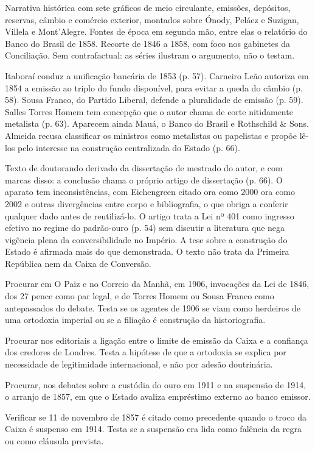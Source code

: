 
Narrativa histórica com sete gráficos de meio circulante, emissões, depósitos, reservas, câmbio e comércio exterior, montados sobre Ónody, Peláez e Suzigan, Villela e Mont'Alegre. Fontes de época em segunda mão, entre elas o relatório do Banco do Brasil de 1858. Recorte de 1846 a 1858, com foco nos gabinetes da Conciliação. Sem contrafactual: as séries ilustram o argumento, não o testam.

Itaboraí conduz a unificação bancária de 1853 (p. 57). Carneiro Leão autoriza em 1854 a emissão ao triplo do fundo disponível, para evitar a queda do câmbio (p. 58). Sousa Franco, do Partido Liberal, defende a pluralidade de emissão (p. 59). Salles Torres Homem tem concepção que o autor chama de corte nitidamente metalista (p. 63). Aparecem ainda Mauá, o Banco do Brasil e Rothschild \& Sons. Almeida recusa classificar os ministros como metalistas ou papelistas e propõe lê-los pelo interesse na construção centralizada do Estado (p. 66).

Texto de doutorando derivado da dissertação de mestrado do autor, e com marcas disso: a conclusão chama o próprio artigo de dissertação (p. 66). O aparato tem inconsistências, com Eichengreen citado ora como 2000 ora como 2002 e outras divergências entre corpo e bibliografia, o que obriga a conferir qualquer dado antes de reutilizá-lo. O artigo trata a Lei nº 401 como ingresso efetivo no regime do padrão-ouro (p. 54) sem discutir a literatura que nega vigência plena da conversibilidade no Império. A tese sobre a construção do Estado é afirmada mais do que demonstrada. O texto não trata da Primeira República nem da Caixa de Conversão.

\begin{dialogo}
\item Procurar em O Paiz e no Correio da Manhã, em 1906, invocações da Lei de 1846, dos 27 pence como par legal, e de Torres Homem ou Sousa Franco como antepassados do debate. Testa se os agentes de 1906 se viam como herdeiros de uma ortodoxia imperial ou se a filiação é construção da historiografia.
\item Procurar nos editoriais a ligação entre o limite de emissão da Caixa e a confiança dos credores de Londres. Testa a hipótese de que a ortodoxia se explica por necessidade de legitimidade internacional, e não por adesão doutrinária.
\item Procurar, nos debates sobre a custódia do ouro em 1911 e na suspensão de 1914, o arranjo de 1857, em que o Estado avaliza empréstimo externo ao banco emissor.
\item Verificar se 11 de novembro de 1857 é citado como precedente quando o troco da Caixa é suspenso em 1914. Testa se a suspensão era lida como falência da regra ou como cláusula prevista.
\end{dialogo}

